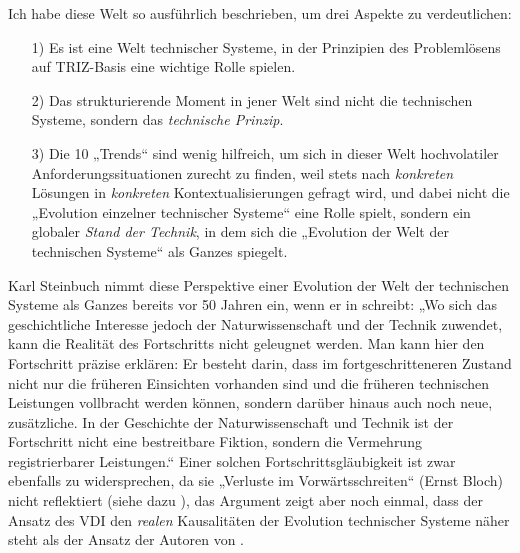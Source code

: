 \documentclass[11pt,a4paper]{article}
\begin{document}
Ich habe diese Welt so ausführlich beschrieben, um drei Aspekte zu
verdeutlichen:
\begin{itemize}
\item [1)] Es ist eine Welt technischer Systeme, in der Prinzipien des
  Problemlösens auf TRIZ-Basis eine wichtige Rolle spielen.
\item [2)] Das strukturierende Moment in jener Welt sind nicht die technischen
  Systeme, sondern das \emph{technische Prinzip}.
\item [3)] Die 10 „Trends“ sind wenig hilfreich, um sich in dieser Welt
  hochvolatiler Anforderungssituationen zurecht zu finden, weil stets nach
  \emph{konkreten} Lösungen in \emph{konkreten} Kontextualisierungen gefragt
  wird, und dabei nicht die „Evolution einzelner technischer Systeme“ eine
  Rolle spielt, sondern ein globaler \emph{Stand der Technik}, in dem sich die
  „Evolution der Welt der technischen Systeme“ als Ganzes spiegelt. 
\end{itemize}
Karl Steinbuch nimmt diese Perspektive einer Evolution der Welt der
technischen Systeme als Ganzes bereits vor 50 Jahren ein, wenn er in
\cite[S. 7]{Steinbuch1966} schreibt: „Wo sich das geschichtliche Interesse
jedoch der Naturwissenschaft und der Technik zuwendet, kann die Realität des
Fortschritts nicht geleugnet werden. Man kann hier den Fortschritt präzise
erklären: Er besteht darin, dass im fortgeschritteneren Zustand nicht nur die
früheren Einsichten vorhanden sind und die früheren technischen Leistungen
vollbracht werden können, sondern darüber hinaus auch noch neue, zusätzliche.
In der Geschichte der Naturwissenschaft und Technik ist der Fortschritt nicht
eine bestreitbare Fiktion, sondern die Vermehrung registrierbarer Leistungen.“
Einer solchen Fortschrittsgläubigkeit ist zwar ebenfalls zu widersprechen, da
sie „Verluste im Vorwärtsschreiten“ (Ernst Bloch) nicht reflektiert (siehe
dazu \cite{Graebe2012}), das Argument zeigt aber noch einmal, dass der Ansatz
des VDI den \emph{realen} Kausalitäten der Evolution technischer Systeme näher
steht als der Ansatz der Autoren von \cite{TESE2018}.
\end{document}
